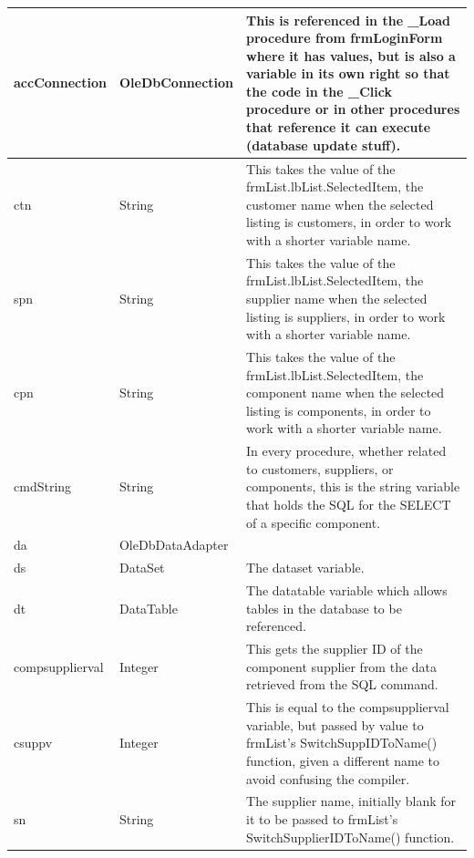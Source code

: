 \begin{longtable}{ | p{4cm} | p{3cm} | p{10cm} |}
		\hline
		accConnection & OleDbConnection & This is referenced in the \_Load procedure from frmLoginForm where it has values, but is also a variable in its own right so that the code in the \_Click procedure or in other procedures that reference it can execute (database update stuff).\\
		\hline
		ctn & String & This takes the value of the frmList.lbList.SelectedItem, the customer name when the selected listing is customers, in order to work with a shorter variable name.\\
		\hline
		spn & String & This takes the value of the frmList.lbList.SelectedItem, the supplier name when the selected listing is suppliers, in order to work with a shorter variable name.\\
		\hline
		cpn & String & This takes the value of the frmList.lbList.SelectedItem, the component name when the selected listing is components, in order to work with a shorter variable name.\\
		\hline
		cmdString & String & In every procedure, whether related to customers, suppliers, or components, this is the string variable that holds the SQL for the SELECT of a specific component.\\
		\hline
		da & OleDbDataAdapter &\\
		\hline
		ds & DataSet & The dataset variable.\\
		\hline
		dt & DataTable & The datatable variable which allows tables in the database to be referenced.\\
		\hline
		compsupplierval & Integer & This gets the supplier ID of the component supplier from the data retrieved from the SQL command.\\
		\hline
		csuppv & Integer & This is equal to the compsupplierval variable, but passed by value to frmList's SwitchSuppIDToName() function, given a different name to avoid confusing the compiler.\\
		\hline
		sn & String & The supplier name, initially blank for it to be passed to frmList's SwitchSupplierIDToName() function.\\
		\hline
	\end{longtable}
	
